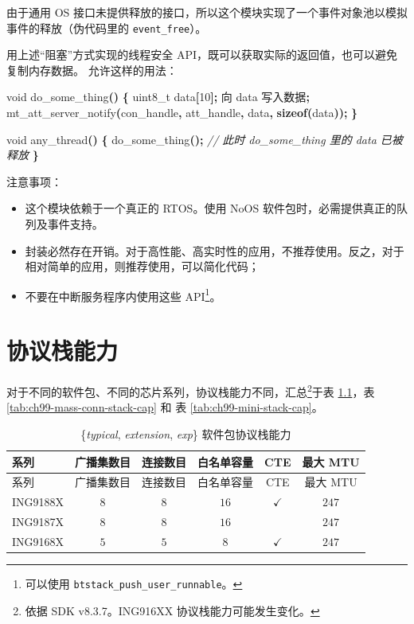 \documentclass[
  12pt,
]{book}
\newenvironment{Shaded}{\begin{snugshade}}{\end{snugshade}}
\newcommand{\CommentTok}[1]{\textcolor[rgb]{0.56,0.35,0.01}{\textit{#1}}}
\newcommand{\DataTypeTok}[1]{\textcolor[rgb]{0.13,0.29,0.53}{#1}}
\newcommand{\DecValTok}[1]{\textcolor[rgb]{0.00,0.00,0.81}{#1}}
\newcommand{\KeywordTok}[1]{\textcolor[rgb]{0.13,0.29,0.53}{\textbf{#1}}}
\newcommand{\NormalTok}[1]{#1}
\newcommand{\OperatorTok}[1]{\textcolor[rgb]{0.81,0.36,0.00}{\textbf{#1}}}
\providecommand{\tightlist}{%
  \setlength{\itemsep}{0pt}\setlength{\parskip}{0pt}}
\begin{document}
由于通用 OS 接口未提供释放的接口，所以这个模块实现了一个事件对象池以模拟事件的释放（伪代码里的 \texttt{event\_free}）。

用上述``阻塞''方式实现的线程安全 API，既可以获取实际的返回值，也可以避免复制内存数据。
允许这样的用法：

\begin{Shaded}
\begin{Highlighting}[]
\DataTypeTok{void}\NormalTok{ do\_some\_thing}\OperatorTok{()}
\OperatorTok{\{}
  \DataTypeTok{uint8\_t}\NormalTok{ data}\OperatorTok{[}\DecValTok{10}\OperatorTok{];}
\NormalTok{  向 data 写入数据}\OperatorTok{;}
\NormalTok{  mt\_att\_server\_notify}\OperatorTok{(}\NormalTok{con\_handle}\OperatorTok{,}
\NormalTok{    att\_handle}\OperatorTok{,}\NormalTok{ data}\OperatorTok{,} \KeywordTok{sizeof}\OperatorTok{(}\NormalTok{data}\OperatorTok{));}
\OperatorTok{\}}

\DataTypeTok{void}\NormalTok{ any\_thread}\OperatorTok{()}
\OperatorTok{\{}
\NormalTok{  do\_some\_thing}\OperatorTok{();}
  \CommentTok{// 此时 do\_some\_thing 里的 data 已被释放}
\OperatorTok{\}}
\end{Highlighting}
\end{Shaded}

注意事项：

\begin{itemize}
\tightlist
\item
  这个模块依赖于一个真正的 RTOS。使用 NoOS 软件包时，必需提供真正的队列及事件支持。
\item
  封装必然存在开销。对于高性能、高实时性的应用，不推荐使用。反之，对于相对简单的应用，则推荐使用，可以简化代码；
\item
  不要在中断服务程序内使用这些 API\footnote{可以使用 \texttt{btstack\_push\_user\_runnable}。}。
\end{itemize}

\hypertarget{ch-cap}{%
\chapter{协议栈能力}\label{ch-cap}}

对于不同的软件包、不同的芯片系列，协议栈能力不同，汇总\footnote{依据 SDK v8.3.7。ING916XX 协议栈能力可能发生变化。}于表 \ref{tab:ch99-typical-stack-cap}，表 \ref{tab:ch99-mass-conn-stack-cap} 和 表 \ref{tab:ch99-mini-stack-cap}。

\begin{longtable}[]{@{}lccccc@{}}
\caption{\label{tab:ch99-typical-stack-cap} \{\emph{typical}, \emph{extension}, \emph{exp}\} 软件包协议栈能力}\tabularnewline
\toprule()
系列 & 广播集数目 & 连接数目 & 白名单容量 & CTE & 最大 MTU \\
\midrule()
\endfirsthead
\toprule()
系列 & 广播集数目 & 连接数目 & 白名单容量 & CTE & 最大 MTU \\
\midrule()
\endhead
ING9188X & \(8\) & \(8\) & \(16\) & \(\checkmark\) & \(247\) \\
ING9187X & \(8\) & \(8\) & \(16\) & & \(247\) \\
ING9168X & \(5\) & \(5\) & \(8\) & \(\checkmark\) & \(247\) \\
\bottomrule()
\end{longtable}
\end{document}
